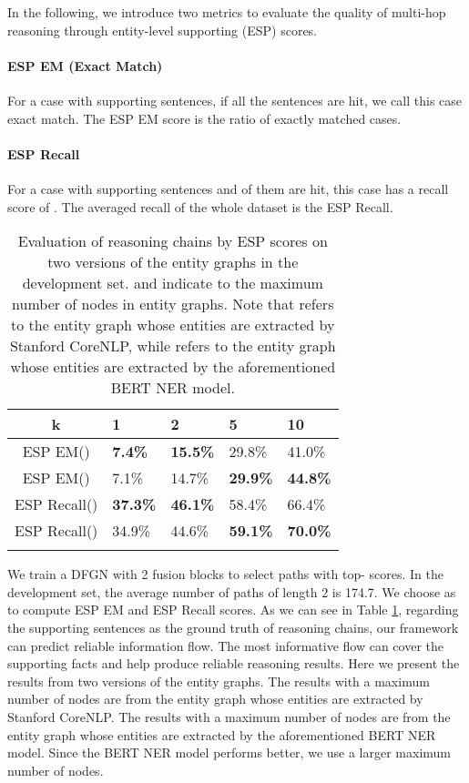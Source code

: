 \documentclass[11pt,a4paper]{article}
\begin{document}
In the following, we introduce two metrics to evaluate the quality of multi-hop reasoning through entity-level supporting (ESP) scores.

\paragraph{ESP EM (Exact Match)} 
For a case with  supporting sentences, if all the  sentences are hit, we call this case exact match. The ESP EM score is the ratio of exactly matched cases. \paragraph{ESP Recall} 
For a case with  supporting sentences and  of them are hit, this case has a recall score of . The averaged recall of the whole dataset is the ESP Recall.

\begin{table}[t]
    \centering
    \begin{tabular}{c|p{0.7cm}<{\centering}p{0.7cm}<{\centering}p{0.7cm}<{\centering}p{0.7cm}<{\centering}} \Xhline{1pt}
        k & 1 & 2 & 5 & 10 \\ \hline
        ESP EM() & \textbf{7.4\%} & \textbf{15.5\%} & 29.8\% & 41.0\% \\
        ESP EM() & 7.1\% & 14.7\% & \textbf{29.9\%} & \textbf{44.8\%} \\
        ESP Recall() & \textbf{37.3\%} & \textbf{46.1\%} & 58.4\% &66.4\% \\ 
        ESP Recall() & 34.9\% & 44.6\% & \textbf{59.1\%} & \textbf{70.0\%} \\\Xhline{1pt}
    \end{tabular}
    \caption{Evaluation of reasoning chains by ESP scores on two versions of the entity graphs in the development set.  and  indicate to the maximum number of nodes in entity graphs. Note that  refers to the entity graph whose entities are extracted by Stanford CoreNLP, while  refers to the entity graph whose entities are extracted by the aforementioned BERT NER model.}
    \label{tab:esp}
\end{table}

We train a DFGN with 2 fusion blocks to select paths with top- scores. In the development set, the average number of paths of length 2 is 174.7. We choose  as  to compute ESP EM and ESP Recall scores. As we can see in Table \ref{tab:esp}, regarding the supporting sentences as the ground truth of reasoning chains, our framework can predict reliable information flow. The most informative flow can cover the supporting facts and help produce reliable reasoning results.
Here we present the results from two versions of the entity graphs. 
The results with a maximum number of nodes  are from the entity graph whose entities are extracted by Stanford CoreNLP.
The results with a maximum number of nodes  are from the entity graph whose entities are extracted by the aforementioned BERT NER model.
Since the BERT NER model performs better, we use a larger maximum number of nodes.
\end{document}

